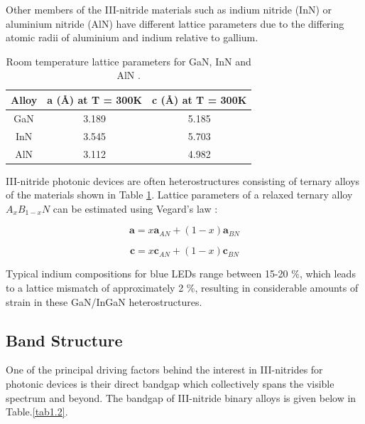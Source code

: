 Other members of the III-nitride materials such as indium nitride  (InN) or aluminium nitride  (AlN) have different lattice parameters due to the differing atomic radii of aluminium and indium relative to gallium.

\begin{table}[!htb]
	\centering
	
	\begin{tabular}{ccc}
		Alloy & \textbf{a} (\si{\angstrom}) at T = 300K & \textbf{c} (\si{\angstrom}) at T = 300K \\
		\hline\hline
		GaN   & 3.189   & 5.185   \\
		InN   & 3.545   & 5.703   \\
		AlN   & 3.112  & 4.982  \\ 
		\hline
	\end{tabular}
	\caption{Room temperature lattice parameters for GaN, InN and AlN \cite{Vurgaftman2003}.}
	\label{lattice-param}
\end{table}

III-nitride photonic devices are often heterostructures consisting of ternary alloys of the materials shown in Table \ref{lattice-param}. Lattice parameters of a relaxed ternary alloy $A_{x}B_{1-x}N$ can be estimated using Vegard's law \cite{Vickers2003}:

\begin{equation}
\mathbf{a} = x \mathbf{a}_{AN} + (1-x)\mathbf{a}_{BN}
\end{equation}

\begin{equation}
\mathbf{c} = x \mathbf{c}_{AN} + (1-x)\mathbf{c}_{BN}
\end{equation}

Typical indium compositions for blue LEDs range between 15-20 $\%$, which leads to a lattice mismatch of approximately 2 $\%$, resulting in considerable amounts of strain in these GaN/InGaN heterostructures.

\subsection{Band Structure} 
\label{section1.1.2}

One of the principal driving factors behind the interest in III-nitrides for photonic devices is their direct bandgap which collectively spans the visible spectrum and beyond. The bandgap of III-nitride binary alloys is given below in Table.\ref{tab1.2}.

